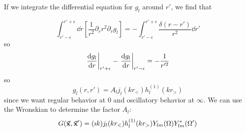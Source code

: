\documentclass[a4paper,twoside,master.tex]{subfiles}
\begin{document}
If we integrate the differential equation for $ g_l $ around $ r' $, we find that

\begin{equation}
    \int_{r'- \epsilon}^{r' + \epsilon} \dd{r} \left[ \frac{1}{r^2} \partial_r r^2 \partial_r g_l \right] = - \int_{r' - \epsilon}^{r' + \epsilon} \frac{\delta(r-r')}{r^2} \dd{r'}
\end{equation}
so
\begin{equation}
    \eval{\dv{g_l}{r}}_{r' + \epsilon} - \eval{\dv{g_l}{r}}_{r' - \epsilon} = - \frac{1}{r'^2}
\end{equation}
so
\begin{equation}
    g_l(r,r') = A_l j_l(kr_<) h_l^{(1)}(kr_>)
\end{equation}
since we want regular behavior at $ 0 $ and oscillatory behavior at $ \infty $. We can use the Wronskian to determine the factor $ A_l $:
\begin{equation}
    G( \va{x}, \va{x}') = (\imath k)j_l(kr_<) h_l^{(1)}(kr_>) Y_{lm}(\Omega) Y_{lm}^*(\Omega')
\end{equation}
\end{document}
